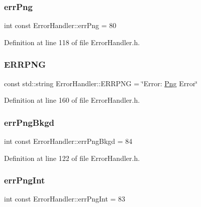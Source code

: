 \subsubsection{\texorpdfstring{errPng}{errPng}}
{\footnotesize\ttfamily int const Error\+Handler\+::err\+Png = 80\hspace{0.3cm}{\ttfamily [static]}}



Definition at line 118 of file Error\+Handler.\+h.

\mbox{\label{classErrorHandler_a8b7f4e33f0118e3a9a49308b8edbb5f3}} 
\subsubsection{\texorpdfstring{ERRPNG}{ERRPNG}}
{\footnotesize\ttfamily const std\+::string Error\+Handler\+::\+E\+R\+R\+P\+NG = \char`\"{}Error\+: \mbox{\hyperlink{classPng}{Png}} Error\char`\"{}\hspace{0.3cm}{\ttfamily [static]}}



Definition at line 160 of file Error\+Handler.\+h.

\mbox{\label{classErrorHandler_ab207964238bf9d2c00f623d6a045fa9f}} 
\subsubsection{\texorpdfstring{errPngBkgd}{errPngBkgd}}
{\footnotesize\ttfamily int const Error\+Handler\+::err\+Png\+Bkgd = 84\hspace{0.3cm}{\ttfamily [static]}}



Definition at line 122 of file Error\+Handler.\+h.

\mbox{\label{classErrorHandler_a6d977525061671cc3f510123163e4ce6}} 
\subsubsection{\texorpdfstring{errPngInt}{errPngInt}}
{\footnotesize\ttfamily int const Error\+Handler\+::err\+Png\+Int = 83\hspace{0.3cm}{\ttfamily [static]}}



